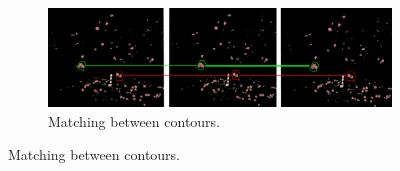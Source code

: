 \begin{figure}[!htbp]
        \centering

        \begin{subfigure}[t]{.8\textwidth}
                \includegraphics[width=\textwidth]{figures/isfm/contourmaps.png}
                \caption{Matching between contours.}
                \label{fig:fcond}
        \end{subfigure}        
        

\end{figure}
